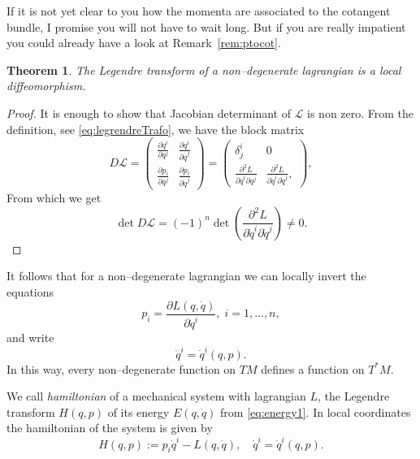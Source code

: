 \documentclass[english,fontsize=11pt,paper=a5,oneside]{scrbook}
\newcommand{\cL}{\mathcal{L}}
\newtheorem{theorem}{Theorem}[chapter]
\theoremstyle{definition}
\begin{document}
If it is not yet clear to you how the momenta are associated to the cotangent bundle, I promise you will not have to wait long. But if you are really impatient you could already have a look at Remark~\ref{rem:ptocot}.

\begin{theorem}
  The Legendre transform of a non--degenerate lagrangian is a local diffeomorphism.
\end{theorem}
\begin{proof}
  It is enough to show that Jacobian determinant of $\cL$ is non zero. From the definition, see \eqref{eq:legrendreTrafo}, we have the block matrix
  \begin{equation}
    D\cL = \begin{pmatrix}
      \frac{\partial q^i}{\partial q^j} & \frac{\partial q^i}{\partial \dot q^j} \\
      \frac{\partial p_i}{\partial q^j} & \frac{\partial p_i}{\partial \dot q^j}
    \end{pmatrix}
    = \begin{pmatrix}
      \delta^i_j                                          & 0                                                          \\
      \frac{\partial^2 L}{\partial \dot q^i \partial q^j} & \frac{\partial^2 L}{\partial \dot q^i  \partial \dot q^j},
    \end{pmatrix},
  \end{equation}
  From which we get
  \begin{equation}
    \det D\cL = (-1)^n \det\left(\frac{\partial^2 L}{\partial \dot q^i  \partial \dot q^j}\right) \neq 0.
  \end{equation}
\end{proof}

It follows that for a non--degenerate lagrangian we can locally invert the equations
\begin{equation}
  p_i = \frac{\partial L(q,\dot q)}{\partial \dot q^i}, \; i=1,\ldots,n,
\end{equation}
and write
\begin{equation}
  \dot q^i = \dot q^i(q,p).
\end{equation}
In this way, every non--degenerate function on $TM$ defines a function on $T^* M$.

\begin{tcolorbox}
  We call \emph{hamiltonian} of a mechanical system with lagrangian $L$, the Legendre transform $H(q,p)$ of its energy $E(q,\dot q)$ from \eqref{eq:energy1}.
  In local coordinates the hamiltonian of the system is given by
  \begin{equation}\label{eq:defH}
    H(q,p) := p_i\dot q^i - L(q, \dot q), \quad \dot q^i = \dot q^i(q,p).
  \end{equation}
\end{tcolorbox}
\end{document}
